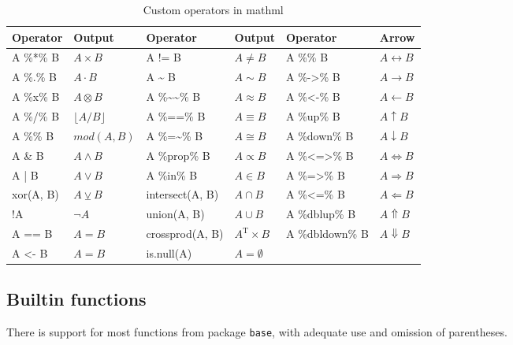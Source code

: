 \begin{table}

\caption{\label{tab:custom-operators}Custom operators in mathml}
\centering
\begin{tabular}[t]{l|l|l|l|l|l}
\hline
Operator & Output & Operator & Output & Operator & Arrow\\
\hline
A \%*\% B & ${A}{\times}{B}$ & A != B & ${A}{\ne}{B}$ & A \%<->\% B & ${A}{\leftrightarrow}{B}$\\
\hline
A \%.\% B & ${A}{\cdot}{B}$ & A \textasciitilde{} B & ${A}{\sim}{B}$ & A \%->\% B & ${A}{\rightarrow}{B}$\\
\hline
A \%x\% B & ${A}{\otimes}{B}$ & A \%\textasciitilde{}\textasciitilde{}\% B & ${A}{\approx}{B}$ & A \%<-\% B & ${A}{\leftarrow}{B}$\\
\hline
A \%/\% B & $\lfloor{{A}{/}{B}}\rfloor$ & A \%==\% B & ${A}{\equiv}{B}$ & A \%up\% B & ${A}{\uparrow}{B}$\\
\hline
A \%\% B & $mod{\left({A}{{,}{B}}\right)}$ & A \%=\textasciitilde{}\% B & ${A}{\cong}{B}$ & A \%down\% B & ${A}{\downarrow}{B}$\\
\hline
A \& B & ${A}{\land}{B}$ & A \%prop\% B & ${A}{\propto}{B}$ & A \%<=>\% B & ${A}{\iff}{B}$\\
\hline
A | B & ${A}{\lor}{B}$ & A \%in\% B & ${A}{\in}{B}$ & A \%=>\% B & ${A}{\Rightarrow}{B}$\\
\hline
xor(A, B) & ${A}{\veebar}{B}$ & intersect(A, B) & ${A}{\cap}{B}$ & A \%<=\% B & ${A}{\Leftarrow}{B}$\\
\hline
!A & ${\lnot}{A}$ & union(A, B) & ${A}{\cup}{B}$ & A \%dblup\% B & ${A}{\Uparrow}{B}$\\
\hline
A == B & ${A}{=}{B}$ & crossprod(A, B) & ${{A}^{\mathrm{T}}}{\times}{B}$ & A \%dbldown\% B & ${A}{\Downarrow}{B}$\\
\hline
A <- B & ${A}{=}{B}$ & is.null(A) & ${A}{=}{\emptyset}$ &  & $\mathrm{}$\\
\hline
\end{tabular}
\end{table}

\hypertarget{builtin-functions}{%
\subsection{Builtin functions}\label{builtin-functions}}

There is support for most functions from package \texttt{base}, with adequate use and
omission of parentheses.

